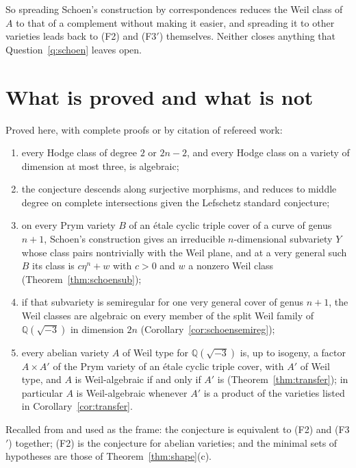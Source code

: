\documentclass[11pt]{amsart}
\theoremstyle{definition}
\theoremstyle{remark}
\newcommand{\QQ}{\mathbb{Q}}
\begin{document}
So spreading Schoen's construction by correspondences reduces the Weil class
of $A$ to that of a complement without making it easier, and spreading it to
other varieties leads back to (F2) and (F3$'$) themselves. Neither closes
anything that Question~\ref{q:schoen} leaves open.

\section{What is proved and what is not}\label{sec:end}

Proved here, with complete proofs or by citation of refereed work:
\begin{enumerate}[label=(\arabic*)]
\item every Hodge class of degree $2$ or $2n-2$, and every Hodge class on a
variety of dimension at most three, is algebraic;
\item the conjecture descends along surjective morphisms, and reduces to
middle degree on complete intersections given the Lefschetz standard
conjecture;
\item on every Prym variety $B$ of an \'etale cyclic triple cover of a
curve of genus $n+1$, Schoen's construction gives an irreducible
$n$-dimensional subvariety $Y$ whose class pairs nontrivially with the Weil
plane, and at a very general such $B$ its class is $c\eta^{n}+w$ with $c>0$
and $w$ a nonzero Weil class (Theorem~\ref{thm:schoensub});
\item if that subvariety is semiregular for one very general cover of genus
$n+1$, the Weil classes are algebraic on every member of the split Weil
family of $\QQ(\sqrt{-3})$ in dimension $2n$ (Corollary~\ref{cor:schoensemireg});
\item every abelian variety $A$ of Weil type for $\QQ(\sqrt{-3})$ is, up to
isogeny, a factor $A\times A'$ of the Prym variety of an \'etale cyclic
triple cover, with $A'$ of Weil type, and $A$ is Weil-algebraic if and only
if $A'$ is (Theorem~\ref{thm:transfer}); in particular $A$ is Weil-algebraic
whenever $A'$ is a product of the varieties listed in
Corollary~\ref{cor:transfer}.
\end{enumerate}

Recalled from \cite{BhH8} and used as the frame: the conjecture is equivalent
to (F2) and (F3$'$) together; (F2) is the conjecture for abelian varieties;
and the minimal sets of hypotheses are those of Theorem~\ref{thm:shape}(c).
\end{document}
